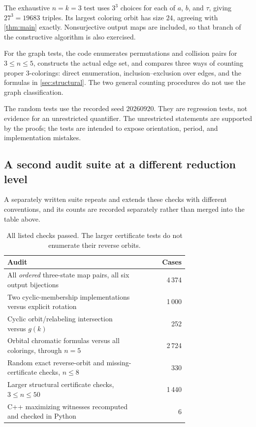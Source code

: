 \documentclass[11pt,a4paper]{article}
\numberwithin{equation}{section}
\theoremstyle{definition}
\theoremstyle{remark}
\begin{document}
The exhaustive $n=k=3$ test uses $3^3$ choices for each of $a$, $b$, and
$\tau$, giving $27^3=19683$ triples. Its largest coloring orbit has size
$24$, agreeing with \cref{thm:main} exactly. Nonsurjective output maps are
included, so that branch of the constructive algorithm is also exercised.

For the graph tests, the code enumerates permutations and collision pairs
for $3\le n\le5$, constructs the actual edge set, and compares three ways
of counting proper $3$-colorings: direct enumeration, inclusion--exclusion
over edges, and the formulas in \cref{sec:structural}. The two general
counting procedures do not use the graph classification.

The random tests use the recorded seed $20260920$. They are regression tests,
not evidence for an unrestricted quantifier. The unrestricted statements are
supported by the proofs; the tests are intended to expose orientation,
period, and implementation mistakes.

\subsection{A second audit suite at a different reduction level}

A separately written suite repeats and extends these checks with different
conventions, and its counts are recorded separately rather than merged into
the table above.

\begin{table}[htbp]
\centering
\begin{tabular}{@{}p{0.73\linewidth}r@{}}
\toprule
Audit & Cases\\
\midrule
All \emph{ordered} three-state map pairs, all six output bijections & 4\,374\\
Two cyclic-membership implementations versus explicit rotation & 1\,000\\
Cyclic orbit/relabeling intersection versus $g(k)$ & 252\\
Orbital chromatic formulas versus all colorings, through $n=5$ & 2\,724\\
Random exact reverse-orbit and missing-certificate checks, $n\le8$ & 330\\
Larger structural certificate checks, $3\le n\le50$ & 1\,440\\
C++ maximizing witnesses recomputed and checked in Python & 6\\
\bottomrule
\end{tabular}
\caption{All listed checks passed. The larger certificate tests do not
enumerate their reverse orbits.}
\label{tab:audits}
\end{table}
\end{document}
